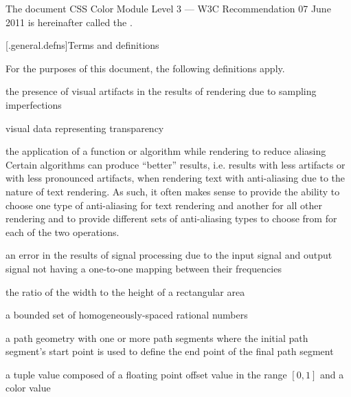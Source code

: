 \pnum
The document CSS Color Module Level 3 --- W3C Recommendation 07 June 2011 is 
hereinafter called the .

[\iotwod.general.defns]{Terms and definitions}

\pnum
{}
For the purposes of this document, the following definitions apply.

the presence of visual artifacts in the results of rendering due to 
sampling imperfections

visual data representing transparency

the application of a function or algorithm while rendering to 
reduce aliasing
\enternote
Certain algorithms can produce ``better'' results, i.e. results with less 
artifacts or with less pronounced artifacts, when rendering text with 
anti-aliasing due to the nature of text rendering. As such, it often makes 
sense to provide the ability to choose one type of anti-aliasing for text 
rendering and another for all other rendering and to provide different sets of 
anti-aliasing types to choose from for each of the two operations.
\exitnote

an error in the results of signal processing due to the input signal and output 
signal not having a one-to-one mapping between their frequencies

the ratio of the width to the height of a rectangular area

a bounded set of homogeneously-spaced rational numbers

a path geometry with one or more path segments where the initial path segment's start point is used to define the end point of the final path segment

a tuple value composed of a floating point offset value in the range $[0, 1]$ and a color value

